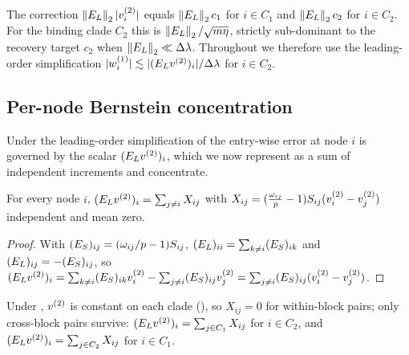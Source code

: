 \begin{remark}\label{rem:C-asym}
The correction $\left\lVert E_{L} \right\rVert_{2}|v^{(2)}_i|$ equals $\left\lVert E_{L} \right\rVert_{2}c_1$ for $i\in C_1$ and
$\left\lVert E_{L} \right\rVert_{2}c_2$ for $i\in C_2$. For the binding clade $C_2$ this is
$\left\lVert E_{L} \right\rVert_{2}/\sqrt{m\eta}$, strictly sub-dominant to the recovery target $c_2$
when $\left\lVert E_{L} \right\rVert_{2}\ll\Delta\lambda$. Throughout  we therefore use the
leading-order simplification $|w^{(1)}_i|\lesssim|(E_{L}v^{(2)})_i|/\Delta\lambda$ for $i\in C_2$.
\end{remark}

\subsection{Per-node Bernstein concentration}\label{app:comp3b}

Under the leading-order simplification of  the entry-wise error
at node $i$ is governed by the scalar $(E_{L}v^{(2)})_i$, which we now represent as a
sum of independent increments and concentrate.

\begin{lemma}\label{lem:C-inc}
For every node $i$, $(E_{L}v^{(2)})_i=\sum_{j\ne i}X_{ij}$ with
$X_{ij}=(\tfrac{\omega_{ij}}{p}-1)S_{ij}(v^{(2)}_i-v^{(2)}_j)$ independent and mean zero.
\end{lemma}
\begin{proof}
With $(E_{S})_{ij}=(\omega_{ij}/p-1)S_{ij}$, $(E_{L})_{ii}=\sum_{k\ne i}(E_{S})_{ik}$ and
$(E_{L})_{ij}=-(E_{S})_{ij}$, so
$(E_{L}v^{(2)})_i=\sum_{k\ne i}(E_{S})_{ik}v^{(2)}_i-\sum_{j\ne i}(E_{S})_{ij}v^{(2)}_j
=\sum_{j\ne i}(E_{S})_{ij}(v^{(2)}_i-v^{(2)}_j)$.
\end{proof}

\begin{proposition}\label{prop:C-within}
Under , $v^{(2)}$ is constant on each clade (), so
$X_{ij}=0$ for within-block pairs; only cross-block pairs survive:
$(E_{L}v^{(2)})_i=\sum_{j\in C_1}X_{ij}$ for $i\in C_2$, and
$(E_{L}v^{(2)})_i=\sum_{j\in C_2}X_{ij}$ for $i\in C_1$.
\end{proposition}

